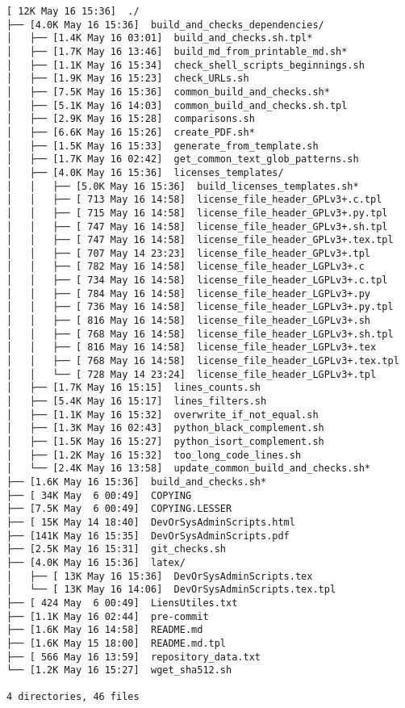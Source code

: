 \documentclass{article}
\begin{document}
\begin{verbatim}
[ 12K May 16 15:36]  ./
├── [4.0K May 16 15:36]  build_and_checks_dependencies/
│   ├── [1.4K May 16 03:01]  build_and_checks.sh.tpl*
│   ├── [1.7K May 16 13:46]  build_md_from_printable_md.sh*
│   ├── [1.1K May 16 15:34]  check_shell_scripts_beginnings.sh
│   ├── [1.9K May 16 15:23]  check_URLs.sh
│   ├── [7.5K May 16 15:36]  common_build_and_checks.sh*
│   ├── [5.1K May 16 14:03]  common_build_and_checks.sh.tpl
│   ├── [2.9K May 16 15:28]  comparisons.sh
│   ├── [6.6K May 16 15:26]  create_PDF.sh*
│   ├── [1.5K May 16 15:33]  generate_from_template.sh
│   ├── [1.7K May 16 02:42]  get_common_text_glob_patterns.sh
│   ├── [4.0K May 16 15:36]  licenses_templates/
│   │   ├── [5.0K May 16 15:36]  build_licenses_templates.sh*
│   │   ├── [ 713 May 16 14:58]  license_file_header_GPLv3+.c.tpl
│   │   ├── [ 715 May 16 14:58]  license_file_header_GPLv3+.py.tpl
│   │   ├── [ 747 May 16 14:58]  license_file_header_GPLv3+.sh.tpl
│   │   ├── [ 747 May 16 14:58]  license_file_header_GPLv3+.tex.tpl
│   │   ├── [ 707 May 14 23:23]  license_file_header_GPLv3+.tpl
│   │   ├── [ 782 May 16 14:58]  license_file_header_LGPLv3+.c
│   │   ├── [ 734 May 16 14:58]  license_file_header_LGPLv3+.c.tpl
│   │   ├── [ 784 May 16 14:58]  license_file_header_LGPLv3+.py
│   │   ├── [ 736 May 16 14:58]  license_file_header_LGPLv3+.py.tpl
│   │   ├── [ 816 May 16 14:58]  license_file_header_LGPLv3+.sh
│   │   ├── [ 768 May 16 14:58]  license_file_header_LGPLv3+.sh.tpl
│   │   ├── [ 816 May 16 14:58]  license_file_header_LGPLv3+.tex
│   │   ├── [ 768 May 16 14:58]  license_file_header_LGPLv3+.tex.tpl
│   │   └── [ 728 May 14 23:24]  license_file_header_LGPLv3+.tpl
│   ├── [1.7K May 16 15:15]  lines_counts.sh
│   ├── [5.4K May 16 15:17]  lines_filters.sh
│   ├── [1.1K May 16 15:32]  overwrite_if_not_equal.sh
│   ├── [1.3K May 16 02:43]  python_black_complement.sh
│   ├── [1.5K May 16 15:27]  python_isort_complement.sh
│   ├── [1.2K May 16 15:32]  too_long_code_lines.sh
│   └── [2.4K May 16 13:58]  update_common_build_and_checks.sh*
├── [1.6K May 16 15:36]  build_and_checks.sh*
├── [ 34K May  6 00:49]  COPYING
├── [7.5K May  6 00:49]  COPYING.LESSER
├── [ 15K May 14 18:40]  DevOrSysAdminScripts.html
├── [141K May 16 15:35]  DevOrSysAdminScripts.pdf
├── [2.5K May 16 15:31]  git_checks.sh
├── [4.0K May 16 15:36]  latex/
│   ├── [ 13K May 16 15:36]  DevOrSysAdminScripts.tex
│   └── [ 13K May 16 14:06]  DevOrSysAdminScripts.tex.tpl
├── [ 424 May  6 00:49]  LiensUtiles.txt
├── [1.1K May 16 02:44]  pre-commit
├── [1.6K May 16 14:58]  README.md
├── [1.6K May 15 18:00]  README.md.tpl
├── [ 566 May 16 13:59]  repository_data.txt
└── [1.2K May 16 15:27]  wget_sha512.sh

4 directories, 46 files
\end{verbatim}
\end{document}
